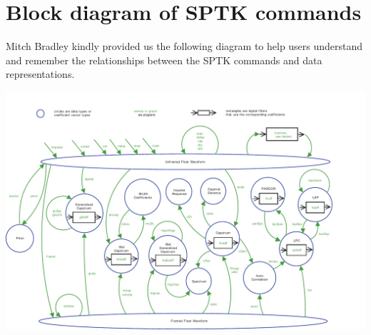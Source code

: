 \chapter*{Block diagram of SPTK commands}%

Mitch Bradley kindly provided us the following diagram to help users understand
and remember the relationships between the SPTK commands and data representations.

\vspace{1.0cm} 

\includegraphics[width=\hsize]{fig/sptk_sigproc.pdf} 
